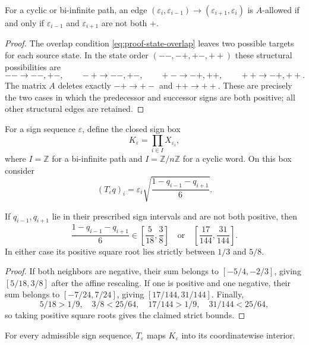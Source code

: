 \begin{lemma}
\label{lem:proof-graph}
For a cyclic or bi-infinite path, an edge
$(\varepsilon_i,\varepsilon_{i-1})\to
(\varepsilon_{i+1},\varepsilon_i)$ is $A$-allowed if and only if
$\varepsilon_{i-1}$ and $\varepsilon_{i+1}$ are not both $+$.
\end{lemma}

\begin{proof}
The overlap condition \eqref{eq:proof-state-overlap} leaves two possible
targets for each source state.  In the state order $(--,-+,+-,++)$ these
structural possibilities are
\[
--\to --,+-,\qquad -+\to --,+-,\qquad
+-\to -+,++,\qquad ++\to -+,++.
\]
The matrix $A$ deletes exactly $-+\to +-$ and $++\to ++$.  These are precisely
the two cases in which the predecessor and successor signs are both positive;
all other structural edges are retained.
\end{proof}

For a sign sequence $\varepsilon$, define the closed sign box
\[
 K_\varepsilon=\prod_{i\in I}X_{\varepsilon_i},
\]
where $I=\mathbb Z$ for a bi-infinite path and $I=\mathbb Z/n\mathbb Z$ for
a cyclic word.  On this box consider
\begin{equation}
 (T_\varepsilon q)_i
 =\varepsilon_i\sqrt{\frac{1-q_{i-1}-q_{i+1}}{6}}.
 \label{eq:proof-signed-map}
\end{equation}

\begin{lemma}
\label{lem:proof-radicand}
If $q_{i-1},q_{i+1}$ lie in their prescribed sign intervals and are not both
positive, then
\[
 \frac{1-q_{i-1}-q_{i+1}}6
 \in \left[\frac5{18},\frac38\right]
 \quad\text{or}\quad
 \left[\frac{17}{144},\frac{31}{144}\right].
\]
In either case its positive square root lies strictly between $1/3$ and
$5/8$.
\end{lemma}

\begin{proof}
If both neighbors are negative, their sum belongs to
$[-5/4,-2/3]$, giving $[5/18,3/8]$ after the affine rescaling.  If one is
positive and one negative, their sum belongs to
$[-7/24,7/24]$, giving $[17/144,31/144]$.  Finally,
\[
 5/18>1/9,\quad 3/8<25/64,\quad
 17/144>1/9,\quad 31/144<25/64,
\]
so taking positive square roots gives the claimed strict bounds.
\end{proof}

\begin{lemma}
\label{lem:proof-self-map}
For every admissible sign sequence, $T_\varepsilon$ maps
$K_\varepsilon$ into its coordinatewise interior.
\end{lemma}

